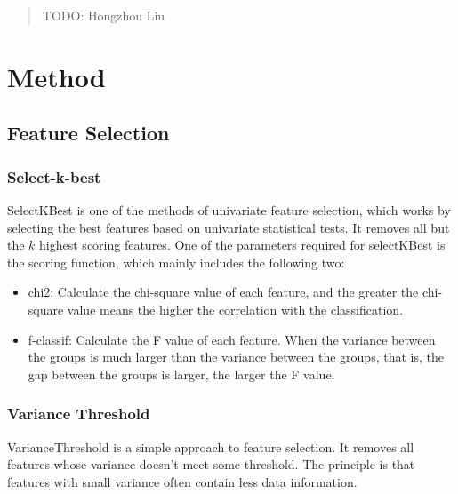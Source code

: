 \documentclass{article}
\begin{document}
\begin{abstract}
  TODO: Hongzhou Liu\\
\end{abstract}

\section{Method}
\subsection{Feature Selection}
\subsubsection{Select-k-best}
\indent SelectKBest is one of the methods of univariate feature selection, which works by selecting the best features based on univariate statistical tests. It removes all but the $k$ highest scoring features. One of the parameters required for selectKBest is the scoring function, which mainly includes the following two:
\begin{itemize}
	\item chi2: Calculate the chi-square value of each feature, and the greater the chi-square value means the higher the correlation with the classification.
	
	\item f-classif: Calculate the F value of each feature. When the variance between the groups is much larger than the variance between the groups, that is, the gap between the groups is larger, the larger the F value.	
\end{itemize}
\subsubsection{Variance Threshold}
\indent VarianceThreshold is a simple approach to feature selection. It removes all features whose variance doesn’t meet some threshold. The principle is that features with small variance often contain less data information.
\end{document}
